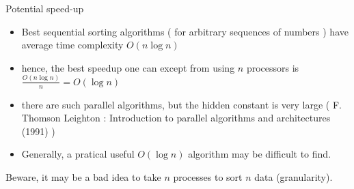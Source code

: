 \documentclass[compress,10pt,aspectratio=169]{beamer}
\begin{document}
\begin{frame}[fragile]{Potential speed-up}
\begin{multicols}{2}
\begin{center}
\end{center}

\begin{itemize}
\item Best sequential sorting algorithms ( for arbitrary sequences of numbers )
  have average time complexity $O(n\log n)$
\item hence, the best speedup one can except from using $n$ processors is
$
\frac{O\left(n\log n\right)}{n} = O(\log n)
$
\item there are such parallel algorithms, but the hidden constant is very large ( F. Thomson Leighton : Introduction to parallel algorithms and architectures (1991) )
\item Generally, a pratical useful $O(\log n)$ algorithm may be difficult to find.
\end{itemize}
\end{multicols}

\alert{Beware}, it may be a bad idea to take $n$ processes to sort $n$ data (granularity).
\end{frame}
\end{document}
